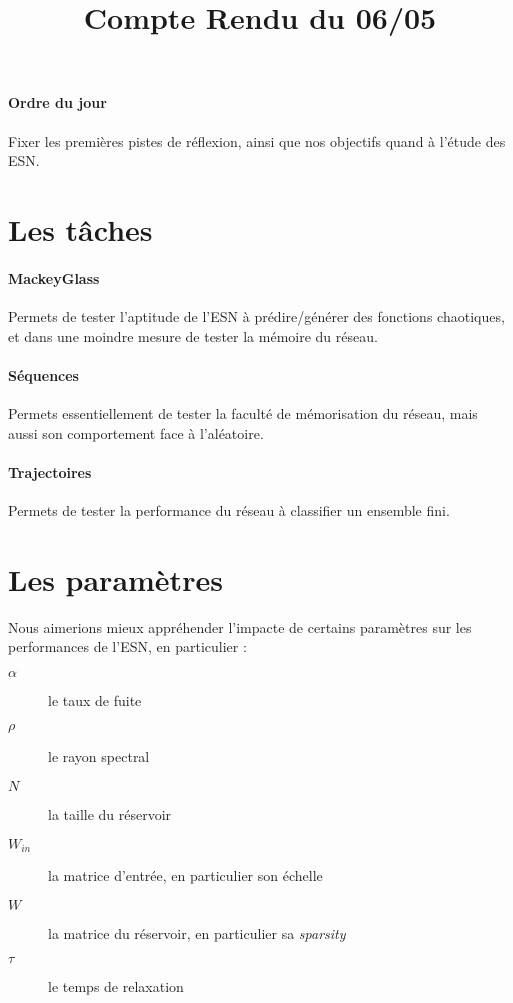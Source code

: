 \documentclass[12pt]{article}
\title{Compte Rendu du 06/05}
\author{}
\date{}
\begin{document}
\maketitle

\paragraph{Ordre du jour}
Fixer les premières pistes de réflexion, ainsi que nos objectifs quand à l'étude des ESN.

\section{Les tâches}
\paragraph{MackeyGlass}
Permets de tester l'aptitude de l'ESN à prédire/générer des fonctions chaotiques, et dans une moindre mesure de tester la mémoire du réseau.
\paragraph{Séquences}
Permets essentiellement de tester la faculté de mémorisation du réseau, mais aussi son comportement face à l'aléatoire.
\paragraph{Trajectoires}
Permets de tester la performance du réseau à classifier un ensemble fini.

\section{Les paramètres}
Nous aimerions mieux appréhender l'impacte de certains paramètres sur les performances de l'ESN, en particulier :
\begin{description}
\item[$\alpha$] le taux de fuite
\item[$\rho$] le rayon spectral
\item[$N$] la taille du réservoir
\item[$W_{in}$] la matrice d'entrée, en particulier son échelle
\item[$W$] la matrice du réservoir, en particulier sa \textit{sparsity}
\item[$\tau$] le temps de relaxation
\end{description}
\end{document}
